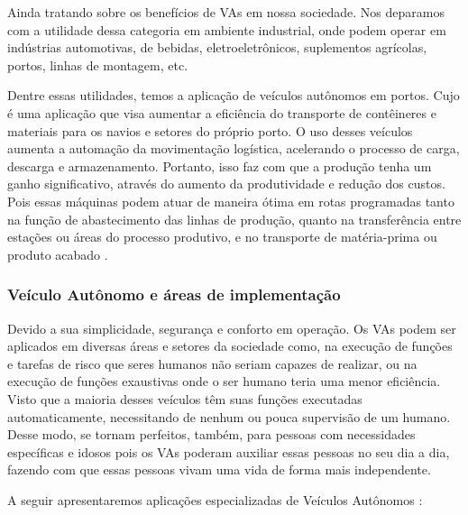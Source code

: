  \label{industria}

Ainda tratando sobre os benefícios de VAs em nossa sociedade. Nos deparamos com a utilidade dessa categoria em ambiente industrial, onde podem operar em indústrias automotivas, de bebidas, eletroeletrônicos, suplementos agrícolas, portos, linhas de montagem, etc.

Dentre essas utilidades, temos a aplicação de veículos autônomos em portos. Cujo é uma aplicação que visa aumentar a eficiência do transporte de contêineres e materiais para os navios e setores do próprio porto. O uso desses veículos aumenta a automação da movimentação logística, acelerando o processo de carga, descarga e armazenamento.
Portanto, isso faz com que a produção tenha um ganho significativo, através do aumento da produtividade e redução dos custos. Pois essas máquinas podem atuar de maneira ótima em rotas programadas tanto na função de abastecimento das linhas de produção, quanto na transferência entre estações ou áreas do processo produtivo, e no transporte de matéria-prima ou produto acabado \cite{aplicacao}.

\subsubsection{Veículo Autônomo e áreas de implementação} \label{implementacao}

Devido a sua simplicidade, segurança e conforto em operação. Os VAs podem ser aplicados em diversas áreas e setores da sociedade como, na execução de funções e tarefas de risco que seres humanos não seriam capazes de realizar, ou na execução de funções exaustivas onde o ser humano teria uma menor eficiência. Visto que a maioria desses veículos têm suas funções executadas automaticamente, necessitando de nenhum ou pouca supervisão de um humano. Desse modo, se tornam perfeitos, também, para pessoas com necessidades específicas e idosos pois os VAs poderam auxiliar essas pessoas no seu dia a dia, fazendo com que essas pessoas vivam uma vida de forma mais independente. 
\vspace {1cm}

A seguir apresentaremos aplicações especializadas de Veículos Autônomos \cite{aplicacao2}:

